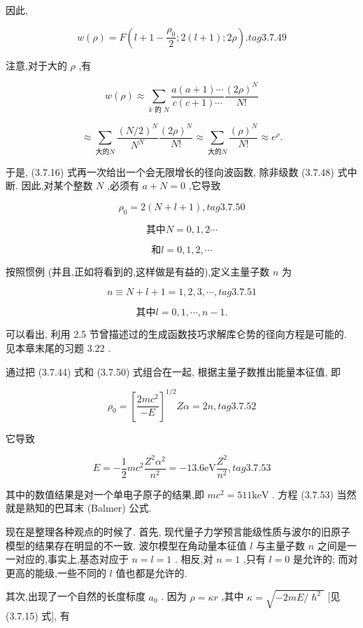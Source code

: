 因此,

$$
w\left( \rho \right) = F\left( {l + 1 - \frac{{\rho }_{0}}{2};2\left( {l + 1}\right) ;{2\rho }}\right) . tag{3. 7.49}
$$

注意,对于大的 $\rho$ ,有

$$
w\left( \rho \right) \approx \mathop{\sum }\limits_{{k\text{ 的 }N}}\frac{a\left( {a + 1}\right) \cdots }{c\left( {c + 1}\right) \cdots }\frac{{\left( 2\rho \right) }^{N}}{N!}
$$

$$
\approx \mathop{\sum }\limits_{{大的N}}\frac{{\left( N/2\right) }^{N}}{{N}^{N}}\frac{{\left( 2\rho \right) }^{N}}{N!} \approx \mathop{\sum }\limits_{{大的N}}\frac{{\left( \rho \right) }^{N}}{N!} \approx {e}^{\rho }.
$$

于是, (3.7.16) 式再一次给出一个会无限增长的径向波函数, 除非级数 (3.7.48) 式中断. 因此,对某个整数 $N$ ,必须有 $a + N = 0$ ,它导致

$$
{\rho }_{0} = 2\left( {N + l + 1}\right) , tag{3. 7.50}
$$

$$
\text{其中}N = 0,1,2\cdots
$$

$$
\text{和}l = 0,1,2,\cdots
$$

按照惯例 (并且,正如将看到的,这样做是有益的),定义主量子数 $n$ 为

$$
n \equiv N + l + 1 = 1,2,3,\cdots , tag{3. 7.51}
$$

$$
\text{其中}l = 0,1,\cdots, n - 1\text{.}
$$

可以看出, 利用 2.5 节曾描述过的生成函数技巧求解库仑势的径向方程是可能的. 见本章末尾的习题 3.22 .

通过把 (3.7.44) 式和 (3.7.50) 式组合在一起, 根据主量子数推出能量本征值, 即

$$
{\rho }_{0} = {\left\lbrack \frac{{2m}{c}^{2}}{-E}\right\rbrack }^{1/2}{Z\alpha } = {2n}, tag{3. 7.52}
$$

它导致

$$
E = - \frac{1}{2}m{c}^{2}\frac{{Z}^{2}{\alpha }^{2}}{{n}^{2}} = - {13.6}\mathrm{{eV}}\frac{{Z}^{2}}{{n}^{2}}, tag{3. 7.53}
$$

其中的数值结果是对一个单电子原子的结果,即 $m{c}^{2} = {511}\mathrm{{keV}}$ . 方程 (3.7.53) 当然就是熟知的巴耳末 (Balmer) 公式.

现在是整理各种观点的时候了. 首先, 现代量子力学预言能级性质与波尔的旧原子模型的结果存在明显的不一致. 波尔模型在角动量本征值 $l$ 与主量子数 $n$ 之间是一一对应的,事实上,基态对应于 $n = l = 1$ . 相反,对 $n = 1$ ,只有 $l = 0$ 是允许的; 而对更高的能级,一些不同的 $l$ 值也都是允许的.

其次,出现了一个自然的长度标度 ${a}_{0}$ . 因为 $\rho = {\kappa r}$ ,其中 $\kappa = \sqrt{-{2mE}/{\hslash }^{2}}$ [见 (3.7.15) 式], 有

